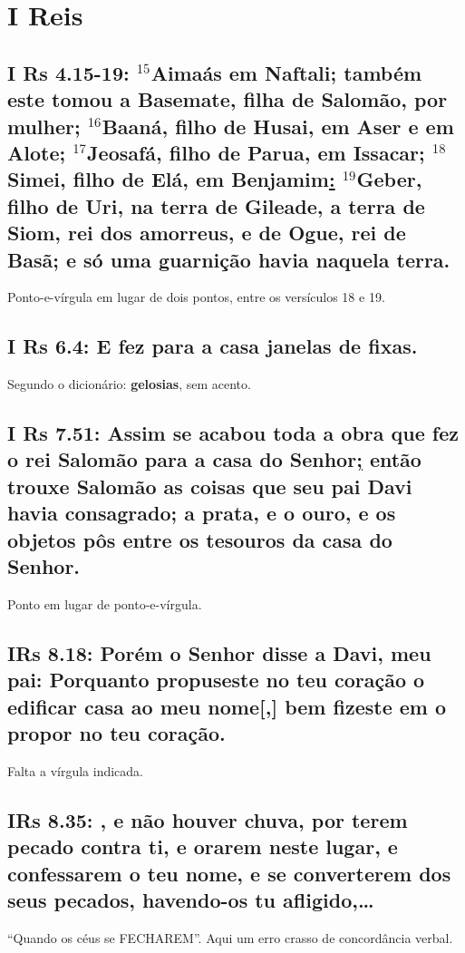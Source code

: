 \section{I Reis}
\subsection{I Rs 4.15-19: $^{\mathrm{15}}$Aimaás em Naftali; também este tomou a Basemate, filha de Salomão, por mulher; $^{\mathrm{16}}$Baaná, filho de Husai, em Aser e em Alote; $^{\mathrm{17}}$Jeosafá, filho de Parua, em Issacar; $^{\mathrm{18}}$Simei, filho de Elá, em Benjamim\uline{:} $^{\mathrm{19}}$Geber, filho de Uri, na terra de Gileade, a terra de Siom, rei dos amorreus, e de Ogue, rei de Basã; e só uma guarnição havia naquela terra.}
Ponto-e-vírgula em lugar de dois pontos, entre os versículos 18 e 19.

\subsection{I Rs 6.4: E fez para a casa janelas de  fixas.}

Segundo o dicionário: \textbf{gelosias}, sem acento.

\subsection{I Rs 7.51: Assim se acabou toda a obra que fez o rei Salomão para a casa do Senhor\uline{;} então trouxe Salomão as coisas que seu pai Davi havia consagrado; a prata, e o ouro, e os objetos pôs entre os tesouros da casa do Senhor.}
Ponto em lugar de ponto-e-vírgula.


\subsection{IRs 8.18: Porém o Senhor disse a Davi, meu pai: Porquanto propuseste no teu coração o edificar casa ao meu nome[,] bem fizeste em o propor no teu coração.}
Falta a vírgula indicada.

\subsection{IRs 8.35: , e não houver chuva, por terem pecado contra ti, e orarem neste lugar, e confessarem o teu nome, e se converterem dos seus pecados, havendo-os tu afligido,\ldots}
``Quando os céus se FECHAREM''. Aqui um erro crasso de concordância verbal.


